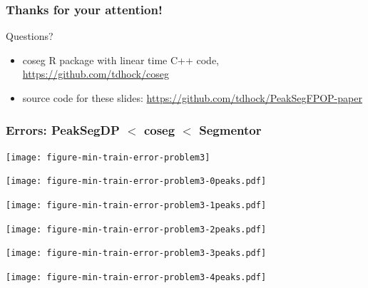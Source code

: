 \documentclass{beamer}
\begin{document}
\begin{frame}
  \frametitle{Thanks for your attention!}

  Questions? 
  \begin{itemize}
  \item 
  coseg R package with linear time C++ code,
  \url{https://github.com/tdhock/coseg}
\item   source code for these slides:
  \url{https://github.com/tdhock/PeakSegFPOP-paper}
  \end{itemize}
\end{frame}

\begin{frame}
  \frametitle{Errors: PeakSegDP $<$ coseg $<$ Segmentor}
  \texttt{[image: figure-min-train-error-problem3]}
\end{frame}

\begin{frame}
  \texttt{[image: figure-min-train-error-problem3-0peaks.pdf]}
\end{frame}

\begin{frame}
  \texttt{[image: figure-min-train-error-problem3-1peaks.pdf]}
\end{frame}

\begin{frame}
  \texttt{[image: figure-min-train-error-problem3-2peaks.pdf]}
\end{frame}

\begin{frame}
  \texttt{[image: figure-min-train-error-problem3-3peaks.pdf]}
\end{frame}

\begin{frame}
  \texttt{[image: figure-min-train-error-problem3-4peaks.pdf]}
\end{frame}







\end{document}

